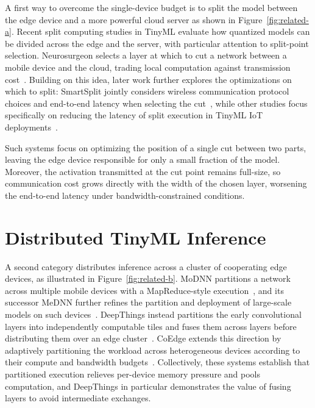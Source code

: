A first way to overcome the single-device budget is to split the model between the edge device and a more powerful cloud server as shown in Figure~\ref{fig:related-a}.
Recent split computing studies in TinyML evaluate how quantized models can be divided across the edge and the server, with particular attention to split-point selection. Neurosurgeon selects a layer at which to cut a network between a mobile device and the cloud, trading local computation against transmission cost~\cite{split-neurosurgeon}.
Building on this idea, later work further explores the optimizations on which to split: SmartSplit jointly considers wireless communication protocol choices and end-to-end latency when selecting the cut~\cite{smartsplit}, while other studies focus specifically on reducing the latency of split execution in TinyML IoT deployments~\cite{optimizingsplit}.


Such systems focus on optimizing the position of a single cut between two parts, leaving the edge device responsible for only a small fraction of the model. Moreover, the activation transmitted at the cut point remains full-size, so communication cost grows directly with the width of the chosen layer, worsening the end-to-end latency under bandwidth-constrained conditions.


\section{Distributed TinyML Inference}
\label{sec:bg-distributed}
A second category distributes inference across a cluster of cooperating edge
devices, as illustrated in Figure~\ref{fig:related-b}. MoDNN partitions a
network across multiple mobile devices with a MapReduce-style
execution~\cite{split-modnn}, and its successor MeDNN further refines the
partition and deployment of large-scale models on such devices~\cite{medNN}.
DeepThings instead partitions the early convolutional layers into
independently computable tiles and fuses them across layers before
distributing them over an edge cluster~\cite{DeepThings}.
CoEdge extends this direction by adaptively partitioning the workload across
heterogeneous devices according to their compute and bandwidth
budgets~\cite{coedge}. Collectively, these systems establish that partitioned
execution relieves per-device memory pressure and pools computation, and
DeepThings in particular demonstrates the value of fusing layers to avoid
intermediate exchanges.

